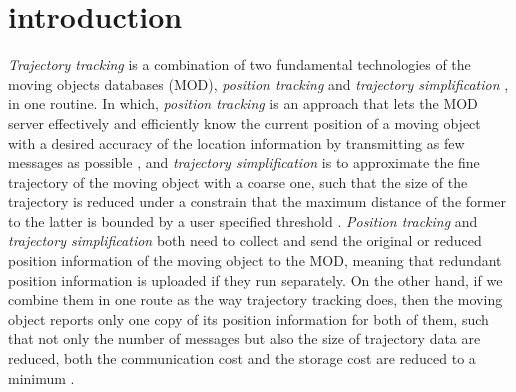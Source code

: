 

\section{introduction}
\label{sec-intro}


\textit{Trajectory tracking} \cite{Lange:Tracking} is a combination of  two fundamental technologies of the moving objects databases (MOD), \textit{position tracking} \cite{Wolfson:PositionTracking,Leonhardi:Comparison} and \textit{trajectory simplification} \cite{Lin:Cised,Zhang:Evaluation}, in one routine. 
In which, \textit{position tracking} is an approach that lets the MOD server effectively and efficiently know the current position of a moving object with a desired accuracy of the location information by transmitting as few messages as possible \cite{Leonhardi:Comparison}, and \textit{trajectory simplification} is to approximate the fine trajectory of the moving object with a coarse one, such that the size of the trajectory is reduced under a constrain that the maximum distance of the former to the latter is bounded by a user specified threshold \cite{Lin:Cised,Zhang:Evaluation}.
\textit{Position tracking} and \textit{trajectory simplification} both need to collect and send the original or reduced position information of the moving object to the MOD, meaning that redundant position information is uploaded if they run separately.
%
On the other hand, if we combine them in one route as the way trajectory tracking does, then the moving object reports only one copy of its position information for both of them, such that not only the number of messages but also the size of trajectory data are reduced, \ie both the communication cost and the storage cost are reduced to a minimum \cite{Lange:Tracking}.

 

